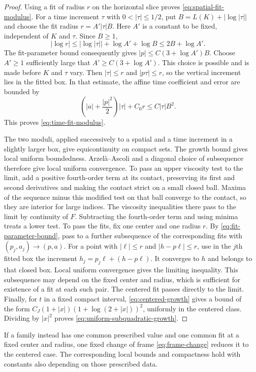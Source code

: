 \begin{proof}
Using a fit of radius $r$ on the horizontal slice proves
\eqref{eq:spatial-fit-modulus}. For a time increment $\tau$ with
$0<|\tau|\le1/2$, put
$B=L(K)+|\log|\tau||$ and choose the fit radius
$r=A'|\tau|B$. Here $A'$ is a constant to be fixed, independent of
$K$ and $\tau$. Since $B\ge1$,
\[
  |\log r|\le|\log|\tau||+\log A'+\log B
       \le2B+\log A'.
\]
The fit-parameter bound consequently gives
$|p|\le C(3+\log A')B$. Choose $A'\ge1$ sufficiently large that
$A'\ge C(3+\log A')$. This choice is possible and is made before
$K$ and $\tau$ vary. Then $|\tau|\le r$ and $|p\tau|\le r$, so
the vertical increment lies in the fitted box. In that estimate,
the affine time coefficient and error are bounded by
\[
  \left(|a|+\frac{|p|^2}{2}\right)|\tau|+C_0r
      \le C|\tau|B^2.
\]
This proves \eqref{eq:time-fit-modulus}.

The two moduli, applied successively to a spatial and a time
increment in a slightly larger box, give equicontinuity on compact
sets. The growth bound gives local uniform boundedness.
Arzel\`a--Ascoli and a diagonal choice of subsequence therefore
give local uniform convergence. To pass an upper viscosity test
to the limit, add a positive fourth-order term at its contact,
preserving its first and second derivatives and making the
contact strict on a small closed ball. Maxima of the sequence
minus this modified test on that ball converge to the contact,
so they are interior for large indices. The viscosity
inequalities there pass to the limit by continuity of $F$.
Subtracting the fourth-order term and using minima treats a
lower test. To pass the fits, fix one
center and one radius $r$. By \eqref{eq:fit-parameter-bound}, pass
to a further subsequence of the corresponding fits with
$(p_j,a_j)\to(p,a)$. For a point with
$|\ell|\le r$ and $|h-p\ell|\le r$, use in the $j$th fitted box
the increment
$h_j=p_j\ell+(h-p\ell)$. It converges to $h$ and belongs to that
closed box. Local uniform convergence gives the limiting
inequality. This subsequence may depend on the fixed center and
radius, which is sufficient for existence of a fit at each such
pair. The centered fit passes directly to the limit.
Finally, for $t$ in a fixed compact interval,
\eqref{eq:centered-growth} gives a bound of the form
$C_J(1+|x|)(1+\log(2+|x|))^2$, uniformly in the centered class.
Dividing by $|x|^2$ proves
\eqref{eq:uniform-subquadratic-growth}.
\end{proof}

If a family instead has one common prescribed value and one common
fit at a fixed center and radius, one fixed change of frame
\eqref{eq:frame-change} reduces it to the centered case. The
corresponding local bounds and compactness hold with constants
also depending on those prescribed data.

